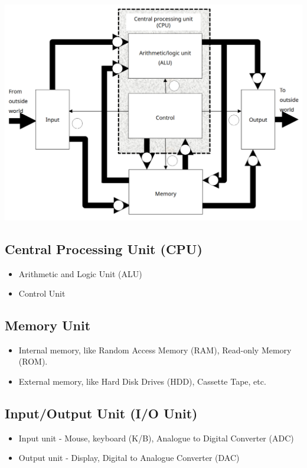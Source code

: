 \documentclass[11pt]{article}
\begin{document}
\begin{center}
\includegraphics[width=.9\linewidth]{./images/basic-computer-structure.png}
\end{center}
\subsection{Central Processing Unit (CPU)}
\label{sec:org330cced}
\begin{itemize}
\item Arithmetic and Logic Unit (ALU)
\item Control Unit
\end{itemize}
\subsection{Memory Unit}
\label{sec:org571eb02}
\begin{itemize}
\item Internal memory, like Random Access Memory (RAM), Read-only Memory (ROM).
\item External memory, like Hard Disk Drives (HDD), Cassette Tape, etc.
\end{itemize}
\subsection{Input/Output Unit (I/O Unit)}
\label{sec:org0e9aa10}
\begin{itemize}
\item Input unit - Mouse, keyboard (K/B), Analogue to Digital Converter (ADC)
\item Output unit - Display, Digital to Analogue Converter (DAC)
\end{itemize}
\end{document}
